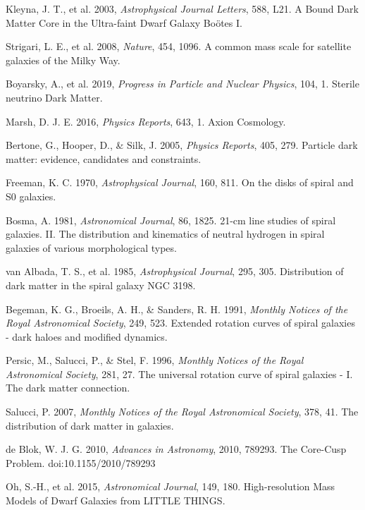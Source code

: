 \documentclass[fleqn,usenatbib]{mnras}
\begin{document}
\begin{thebibliography}{99}
 Kleyna, J. T., et al. 2003, \textit{Astrophysical Journal Letters}, 588, L21. A Bound Dark Matter Core in the Ultra-faint Dwarf Galaxy Boötes I.

 Strigari, L. E., et al. 2008, \textit{Nature}, 454, 1096. A common mass scale for satellite galaxies of the Milky Way.

 Boyarsky, A., et al. 2019, \textit{Progress in Particle and Nuclear Physics}, 104, 1. Sterile neutrino Dark Matter.

 Marsh, D. J. E. 2016, \textit{Physics Reports}, 643, 1. Axion Cosmology.

 Bertone, G., Hooper, D., \& Silk, J. 2005, \textit{Physics Reports}, 405, 279. Particle dark matter: evidence, candidates and constraints.

 Freeman, K. C. 1970, \textit{Astrophysical Journal}, 160, 811. On the disks of spiral and S0 galaxies.

 Bosma, A. 1981, \textit{Astronomical Journal}, 86, 1825. 21-cm line studies of spiral galaxies. II. The distribution and kinematics of neutral hydrogen in spiral galaxies of various morphological types.

 van Albada, T. S., et al. 1985, \textit{Astrophysical Journal}, 295, 305. Distribution of dark matter in the spiral galaxy NGC 3198.

 Begeman, K. G., Broeils, A. H., \& Sanders, R. H. 1991, \textit{Monthly Notices of the Royal Astronomical Society}, 249, 523. Extended rotation curves of spiral galaxies - dark haloes and modified dynamics.

 Persic, M., Salucci, P., \& Stel, F. 1996, \textit{Monthly Notices of the Royal Astronomical Society}, 281, 27. The universal rotation curve of spiral galaxies - I. The dark matter connection.

 Salucci, P. 2007, \textit{Monthly Notices of the Royal Astronomical Society}, 378, 41. The distribution of dark matter in galaxies.

 de Blok, W. J. G. 2010, \textit{Advances in Astronomy}, 2010, 789293. The Core-Cusp Problem. doi:10.1155/2010/789293

 Oh, S.-H., et al. 2015, \textit{Astronomical Journal}, 149, 180. High-resolution Mass Models of Dwarf Galaxies from LITTLE THINGS.


\end{thebibliography}
\end{document}
